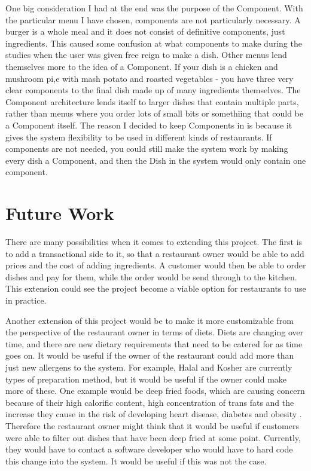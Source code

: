 One big consideration I had at the end was the purpose of the Component. With the particular menu I have chosen, components are not particularly necessary. A burger is a whole meal and it does not consist of definitive components, just ingredients. This caused some confusion at what components to make during the studies when the user was given free reign to make a dish. Other menus lend themselves more to the idea of a Component. If your dish is a chicken and mushroom pi,e with mash potato and roasted vegetables - you have three very clear components to the final dish made up of many ingredients themselves. The Component architecture lends itself to larger dishes that contain multiple parts, rather than menus where you order lots of small bits or somethiing that could be a Component itself. The reason I decided to keep Components in is because it gives the system flexibility to be used in different kinds of restaurants. If components are not needed, you could still make the system work by making every dish a Component, and then the Dish in the system would only contain one component.

\section{Future Work}

There are many possibilities when it comes to extending this project. The first is to add a transactional side to it, so that a restaurant owner would be able to add prices and the cost of adding ingredients. A customer would then be able to order dishes and pay for them, while the order would be send through to the kitchen. This extension could see the project become a viable option for restaurants to use in practice. 

Another extension of this project would be to make it more customizable from the perspective of the restaurant owner in terms of diets. Diets are changing over time, and there are new dietary requirements that need to be catered for as time goes on. It would be useful if the owner of the restaurant could add more than just new allergens to the system. For example, Halal and Kosher are currently types of preparation method, but it would be useful if the owner could make more of these. One example would be deep fried foods, which are causing concern because of their high calorific content, high concentration of trans fats and the increase they cause in the risk of developing heart disease, diabetes and obesity \cite{deep_fried_mcdonnell_2023}. Therefore the restaurant owner might think that it would be useful if customers were able to filter out dishes that have been deep fried at some point. Currently, they would have to contact a software developer who would have to hard code this change into the system. It would be useful if this was not the case.

